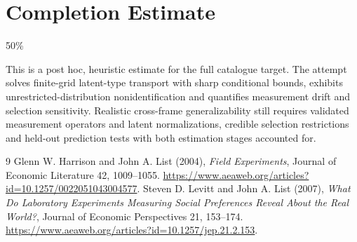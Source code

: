 \documentclass[11pt]{article}
\begin{document}
\section{Completion Estimate}
50\%

This is a post hoc, heuristic estimate for the full catalogue target.
The attempt solves finite-grid latent-type transport with sharp conditional bounds, exhibits unrestricted-distribution nonidentification and quantifies measurement drift and selection sensitivity. Realistic cross-frame generalizability still requires validated measurement operators and latent normalizations, credible selection restrictions and held-out prediction tests with both estimation stages accounted for.

\begin{thebibliography}{9}
 Glenn W. Harrison and John A. List (2004),
\emph{Field Experiments}, Journal of Economic Literature 42, 1009--1055.
\url{https://www.aeaweb.org/articles?id=10.1257/0022051043004577}.
 Steven D. Levitt and John A. List (2007),
\emph{What Do Laboratory Experiments Measuring Social Preferences Reveal
About the Real World?}, Journal of Economic Perspectives 21, 153--174.
\url{https://www.aeaweb.org/articles?id=10.1257/jep.21.2.153}.
\end{thebibliography}
\end{document}
